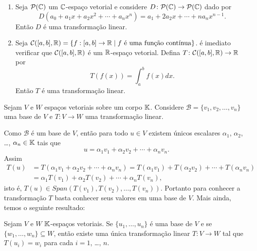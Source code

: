 \begin{exemplo}
\begin{enumerate}[label={\arabic*})]
    \item Seja $\mathcal{P}(\mathbb{C})$ um $\mathbb{C}$-espaço vetorial e considere $D \colon \mathcal{P}(\mathbb{C}) \to \mathcal{P}(\mathbb{C})$ dado por
    \[
      D(a_0 + a_1x + a_2x^2 + \cdots + a_nx^n) = a_1 + 2a_2x + \cdots + na_nx^{n-1}.
    \]
    Então $D$ é uma transformação linear.

    \item Seja $\mathcal{C}([a,b], \mathbb{R}) = \{ f : [a,b] \to \mathbb{R} \mid f \mbox{ é uma função contínua}\}$. é imediato verificar que $\mathcal{C}([a,b], \mathbb{R})$ é um $\mathbb{R}$-espaço vetorial. Defina $T \colon \mathcal{C}([a,b], \mathbb{R}) \to \mathbb{R}$ por
    \[
      T(f(x)) = \int_a^bf(x)dx.
    \]
    Então $T$ é uma transformação linear.
  \end{enumerate}
\end{exemplo}

Sejam $V$ e $W$ espaços vetoriais sobre um corpo $\mathbb{K}$. Considere $\mathcal{B} = \{v_1, v_2, \dots, v_n\}$ uma base de $V$ e $T \colon V \to W$ uma transformação linear.

Como $\mathcal{B}$ é um base de $V$, então para todo $u \in V$ existem únicos escalares $\alpha_1$, $\alpha_2$, \dots, $\alpha_n \in \mathbb{K}$ tais que
\[
    u = \alpha_1v_1 + \alpha_2v_2 + \cdots + \alpha_nv_n.
\]
Assim
\begin{align*}
    T(u) &= T(\alpha_1v_1 + \alpha_2v_2 + \cdots + \alpha_nv_n) = T(\alpha_1v_1) + T(\alpha_2v_2) + \cdots + T(\alpha_nv_n) \\ &= \alpha_1T(v_1) + \alpha_2T(v_2) + \cdots + \alpha_nT(v_n),
\end{align*}
isto é, $T(u) \in Span(T(v_1), T(v_2), \dots, T(v_n))$. Portanto para conhecer a transformação $T$ basta conhecer seus valores em uma base de $V$. Mais ainda, temos o seguinte resultado:

\begin{teorema}\label{existencia_de_transformacao_unica_dado_valores}
  Sejam $V$ e $W$ $\mathbb{K}$-espaços vetoriais. Se $\{u_1, \dots, u_n\}$ é uma base de $V$ e se $\{w_1, \dots, w_n\} \subseteq W$, então existe uma única transformação linear $T \colon V \to W$ tal que $T(u_i) = w_i$ para cada $i = 1$, \dots, $n$.
\end{teorema}

